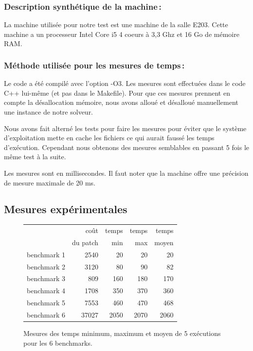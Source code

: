 \documentclass[a4paper, 10pt, french]{article}
\begin{document}
    \subsubsection{Description synthétique de la machine\,:} 

    La machine utilisée pour notre test est une machine de la salle E203.
    Cette machine a un processeur Intel Core i5 4 coeurs à 3,3 Ghz et 16 Go de mémoire RAM.

    \subsubsection{Méthode utilisée pour les mesures de temps\,: } 

    Le code a été compilé avec l'option -O3.
    Les mesures sont effectuées dans le code C++ lui-même (et pas dans le Makefile).
    Pour que ces mesures prennent en compte la désallocation mémoire, nous avons
    alloué et désalloué manuellement une instance de notre solveur.

    Nous avons fait alterné les tests pour faire les mesures pour éviter que
    le système d'exploitation mette en cache les fichiers ce qui aurait faussé les temps d'exécution.
    Cependant nous obtenons des mesures semblables en passant 5 fois le même test à la suite.

    Les mesures sont en millisecondes.
    Il faut noter que la machine offre une précision de mesure maximale de 20 ms.

  \subsection{Mesures expérimentales}

    \begin{figure}[h!]
      \begin{center}
        \begin{tabular}{|l||r||r|r|r||}
          \hline
          \hline
            & coût         & temps     & temps   & temps \\
            & du patch     & min       & max     & moyen \\
          \hline
          \hline
            benchmark 1 & 2540 & 20 & 20 & 20 \\
          \hline
            benchmark 2 & 3120 & 80 & 90 & 82 \\
          \hline
            benchmark 3 & 809 & 160 & 180 & 170 \\
          \hline
            benchmark 4 & 1708 & 350 & 370 & 360 \\
          \hline
            benchmark 5 & 7553 & 460 & 470 & 468 \\
          \hline
            benchmark 6 & 37027 & 2050 & 2070 & 2060 \\
          \hline
          \hline
        \end{tabular}
        \caption{Mesures des temps minimum, maximum et moyen de 5 exécutions pour les 6 benchmarks.}
        \label{table-temps}
      \end{center}
    \end{figure}
\end{document}
